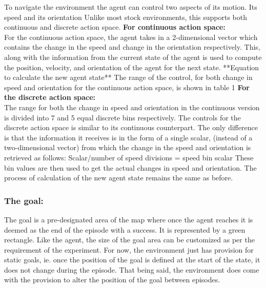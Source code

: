 To navigate the environment the agent can control two aspects of its motion. Its speed and its orientation
Unlike most stock environments, this supports both continuous and discrete action space. 
\textbf{For continuous action space:}\\
For the continuous action space, the agent takes in a 2-dimensional vector which contains the change in the speed and change in the orientation respectively. This, along with the information from the current state of the agent is used to compute the position, velocity, and orientation of the agent for the next state.
**Equation to calculate the new agent state**
The range of the control, for both change in speed and orientation for the continuous action space, is shown in table 1
\textbf{For the discrete action space:}\\
The range for both the change in speed and orientation in the continuous version is divided into 7 and 5 equal discrete bins respectively. 
The controls for the discrete action space is similar to its continuous counterpart. The only difference is that the information it receives is in the form of a single scalar, (instead of a two-dimensional vector) from which the change in the speed and orientation is retrieved as follows:
Scalar/number of speed divisions = speed bin
scalar%
These bin values are then used to get the actual changes in speed and orientation. The process of calculation of the new agent state remains the same as before.


\subsubsection*{The goal:}
The goal is a pre-designated area of the map where once the agent reaches it is deemed as the end of the episode with a success. It is represented by a green rectangle. Like the agent, the size of the goal area can be customized as per the requirement of the experiment. For now, the environment just has provision for static goals, ie. once the position of the goal is defined at the start of the state, it does not change during the episode. That being said, the environment does come with the provision to alter the position of the goal between episodes.


